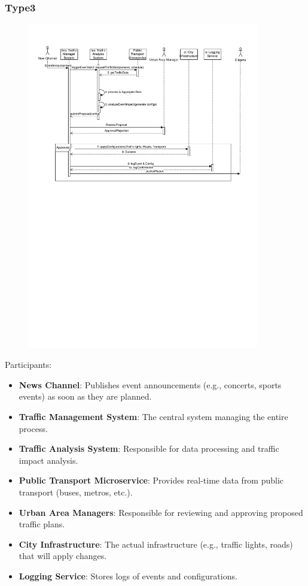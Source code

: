 \documentclass[11.5pt]{article}
\begin{document}
    \subsubsection{Type3}
    \begin{figure}[htbp]
        \centering
        \includegraphics[width=0.9\textwidth]{figures/sequence-diagram-type3.pdf}
    \end{figure}
    \par{Participants:}
    \begin{itemize}
        \item \textbf{News Channel}: Publishes event announcements (e.g., concerts, sports events) as soon as they are planned.
        \item \textbf{Traffic Management System}: The central system managing the entire process.
        \item \textbf{Traffic Analysis System}: Responsible for data processing and traffic impact analysis.
        \item \textbf{Public Transport Microservice}: Provides real-time data from public transport (buses, metros, etc.).
        \item \textbf{Urban Area Managers}: Responsible for reviewing and approving proposed traffic plans.
        \item \textbf{City Infrastructure}: The actual infrastructure (e.g., traffic lights, roads) that will apply changes.
        \item \textbf{Logging Service}: Stores logs of events and configurations.
    \end{itemize}
\end{document}
